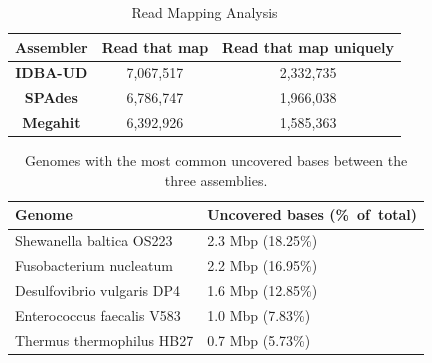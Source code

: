 \documentclass[10pt,a4paper,twocolumn]{article}
\begin{document}
\begin{table}[!ht]
\caption{Read Mapping Analysis}
\centering
\begin{tabular}{|c|c|c|}
\hline

\textbf{Assembler}& \textbf{Read that map} &  \textbf{Read that map uniquely}    \\ [0.5ex] %
\hline
\textbf{IDBA-UD}&7,067,517 &2,332,735 \\
\hline
\textbf{SPAdes}&6,786,747&1,966,038  \\
\hline
\textbf{Megahit}&6,392,926&1,585,363  \\
\hline
\end{tabular}
\label{table:read-mapping} 
\end{table}
\begin{table}[!h]
 \centering
 \caption{Genomes with the most common uncovered bases between the three assemblies.}
 \begin{tabular}{|p{4.50cm}|p{2.75cm}|} \hline
\textbf{Genome} & \textbf{Uncovered bases (\%~of~total)} \\ \hline 
Shewanella baltica OS223 & 2.3 Mbp (18.25\%) \\ \hline
Fusobacterium nucleatum & 2.2 Mbp (16.95\%) \\ \hline
Desulfovibrio vulgaris DP4 & 1.6 Mbp (12.85\%) \\ \hline
Enterococcus faecalis V583 & 1.0 Mbp (7.83\%) \\ \hline
Thermus thermophilus HB27 & 0.7 Mbp (5.73\%) \\ \hline
\end{tabular}
\label{table:genomes_uncovered}
\end{table}

\end{document}
